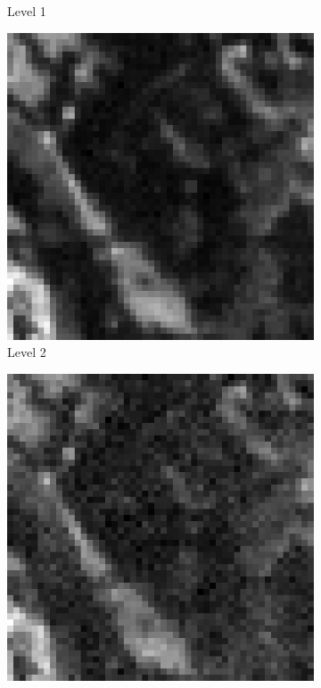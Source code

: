 \begin{figure}[htpb]
\begin{subfigure}{.2\textwidth}
\caption{Level 1}
\end{subfigure}%
\begin{subfigure}{.2\textwidth}
\includegraphics[width=\textwidth]{img/imageNoiseLevel2}
\caption{Level 2}
\end{subfigure}%
\begin{subfigure}{.2\textwidth}
\includegraphics[width=\textwidth]{img/imageNoiseLevel3}

\end{subfigure}
\end{figure}
